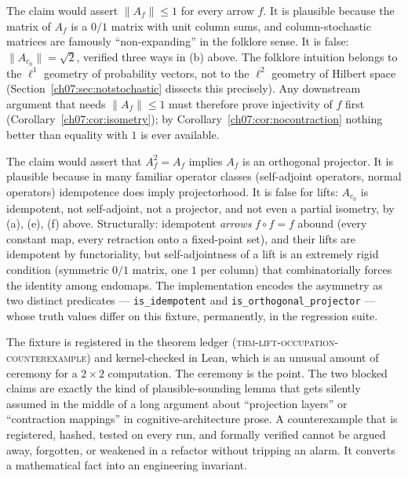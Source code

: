 \begin{boundary}\label{ch07:bd:contractive}
The claim would assert $\lVert A_f\rVert\le 1$ for every arrow $f$. It is
plausible because the matrix of $A_f$ is a $0/1$ matrix with unit column
sums, and column-stochastic matrices are famously ``non-expanding'' in the
folklore sense. It is false: $\lVert A_{c_0}\rVert=\sqrt2$, verified three
ways in (b) above. The folklore intuition belongs to the $\ell^1$ geometry
of probability vectors, not to the $\ell^2$ geometry of Hilbert space
(Section~\ref{ch07:sec:notstochastic} dissects this precisely). Any
downstream argument that needs $\lVert A_f\rVert\le 1$ must therefore prove
injectivity of $f$ first (Corollary~\ref{ch07:cor:isometry}); by
Corollary~\ref{ch07:cor:nocontraction} nothing better than equality with
$1$ is ever available.
\end{boundary}

\begin{boundary}\label{ch07:bd:projector}
The claim would assert that $A_f^2=A_f$ implies $A_f$ is an orthogonal
projector. It is plausible because in many familiar operator classes
(self-adjoint operators, normal operators) idempotence does imply
projectorhood. It is false for lifts: $A_{c_0}$ is idempotent, not
self-adjoint, not a projector, and not even a partial isometry, by (a),
(e), (f) above. Structurally: idempotent \emph{arrows} $f\circ f=f$
abound (every constant map, every retraction onto a fixed-point set), and
their lifts are idempotent by functoriality, but self-adjointness of a lift
is an extremely rigid condition (symmetric $0/1$ matrix, one $1$ per
column) that combinatorially forces the identity among endomaps. The
implementation encodes the asymmetry as two distinct predicates ---
\texttt{is\_idempotent} and \texttt{is\_orthogonal\_projector} --- whose
truth values differ on this fixture, permanently, in the regression suite.
\end{boundary}

\begin{remark}
The fixture is registered in the theorem ledger
(\textsc{thm-lift-occupation-counterexample}) and kernel-checked in Lean,
which is an unusual amount of ceremony for a $2\times 2$ computation. The
ceremony is the point. The two blocked claims are exactly the kind of
plausible-sounding lemma that gets silently assumed in the middle of a long
argument about ``projection layers'' or ``contraction mappings'' in
cognitive-architecture prose. A counterexample that is registered, hashed,
tested on every run, and formally verified cannot be argued away, forgotten,
or weakened in a refactor without tripping an alarm. It converts a
mathematical fact into an engineering invariant.
\end{remark}

